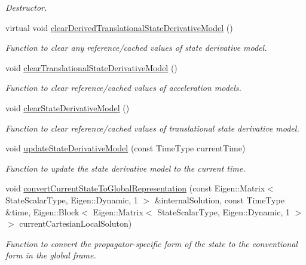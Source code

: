 \begin{DoxyCompactItemize}
\begin{DoxyCompactList}\small\item\em Destructor. \end{DoxyCompactList}\item 
virtual void \hyperlink{classtudat_1_1propagators_1_1NBodyStateDerivative_aa1485260a3a591741454070ce4b89fb2}{clear\+Derived\+Translational\+State\+Derivative\+Model} ()
\begin{DoxyCompactList}\small\item\em Function to clear any reference/cached values of state derivative model. \end{DoxyCompactList}\item 
void \hyperlink{classtudat_1_1propagators_1_1NBodyStateDerivative_a24ded178bab0fdf4155b5c2fea461e9a}{clear\+Translational\+State\+Derivative\+Model} ()
\begin{DoxyCompactList}\small\item\em Function to clear reference/cached values of acceleration models. \end{DoxyCompactList}\item 
void \hyperlink{classtudat_1_1propagators_1_1NBodyStateDerivative_a1a4df6d3bc026a5d7d780f812fc10ba3}{clear\+State\+Derivative\+Model} ()
\begin{DoxyCompactList}\small\item\em Function to clear reference/cached values of translational state derivative model. \end{DoxyCompactList}\item 
void \hyperlink{classtudat_1_1propagators_1_1NBodyStateDerivative_a1db2b5b538eeb857e040a8744d886e61}{update\+State\+Derivative\+Model} (const Time\+Type current\+Time)
\begin{DoxyCompactList}\small\item\em Function to update the state derivative model to the current time. \end{DoxyCompactList}\item 
void \hyperlink{classtudat_1_1propagators_1_1NBodyStateDerivative_a17b2f9c92c77ced3cfa2b563878c84eb}{convert\+Current\+State\+To\+Global\+Representation} (const Eigen\+::\+Matrix$<$ State\+Scalar\+Type, Eigen\+::\+Dynamic, 1 $>$ \&internal\+Solution, const Time\+Type \&time, Eigen\+::\+Block$<$ Eigen\+::\+Matrix$<$ State\+Scalar\+Type, Eigen\+::\+Dynamic, 1 $>$ $>$ current\+Cartesian\+Local\+Soluton)
\begin{DoxyCompactList}\small\item\em Function to convert the propagator-\/specific form of the state to the conventional form in the global frame. \end{DoxyCompactList}\item 

\end{DoxyCompactItemize}
